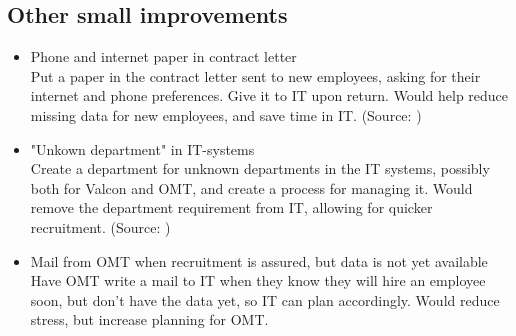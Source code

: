 \subsection{Other small improvements}
\begin{itemize}
	\item Phone and internet paper in contract letter\\
	
			Put a paper in the contract letter sent to new employees, asking for their internet and phone preferences. Give it to IT upon return. Would help reduce missing data for new employees, and save time in IT.
			(Source: )			
	
	\item "Unkown department" in IT-systems\\
	
			Create a department for unknown departments in the IT systems, possibly both for Valcon and OMT, and create a process for managing it.
			Would remove the department requirement from IT, allowing for quicker recruitment.
			(Source: )
			
	\item Mail from OMT when recruitment is assured, but data is not yet available\\
	
			Have OMT write a mail to IT when they know they will hire an employee soon, but don't have the data yet, so IT can plan accordingly.
			Would reduce stress, but increase planning for OMT.
\end{itemize}